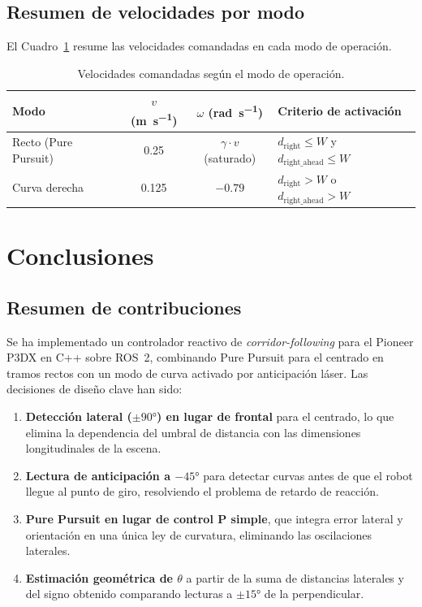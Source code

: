 \documentclass[12pt]{article}
\begin{document}
\subsection{Resumen de velocidades por modo}
El Cuadro~\ref{tab:velocidades} resume las velocidades comandadas en cada modo de operación.

\begin{table}[H]
  \centering
  \caption{Velocidades comandadas según el modo de operación.}
  \label{tab:velocidades}
  \begin{tabularx}{0.85\linewidth}{l c c X}
    \toprule
    \textbf{Modo} & $v$ (\si{\meter\per\second}) & $\omega$ (\si{\radian\per\second}) & \textbf{Criterio de activación} \\
    \midrule
    Recto (Pure Pursuit) & 0.25 & $\gamma \cdot v$ (saturado) & $d_\text{right} \leq W$ y $d_\text{right\_ahead} \leq W$ \\
    Curva derecha & 0.125 & $-0.79$ & $d_\text{right} > W$ o $d_\text{right\_ahead} > W$ \\
    \bottomrule
  \end{tabularx}
\end{table}


\section{Conclusiones}

\subsection{Resumen de contribuciones}
Se ha implementado un controlador reactivo de \emph{corridor-following} para el Pioneer P3DX en C++ sobre ROS~2, combinando Pure Pursuit para el centrado en tramos rectos con un modo de curva activado por anticipación láser. Las decisiones de diseño clave han sido:

\begin{enumerate}[leftmargin=2em]
  \item \textbf{Detección lateral ($\pm 90°$) en lugar de frontal} para el centrado, lo que elimina la dependencia del umbral de distancia con las dimensiones longitudinales de la escena.
  \item \textbf{Lectura de anticipación a $-45°$} para detectar curvas antes de que el robot llegue al punto de giro, resolviendo el problema de retardo de reacción.
  \item \textbf{Pure Pursuit en lugar de control P simple}, que integra error lateral y orientación en una única ley de curvatura, eliminando las oscilaciones laterales.
  \item \textbf{Estimación geométrica de $\theta$} a partir de la suma de distancias laterales y del signo obtenido comparando lecturas a $\pm 15°$ de la perpendicular.
\end{enumerate}
\end{document}
